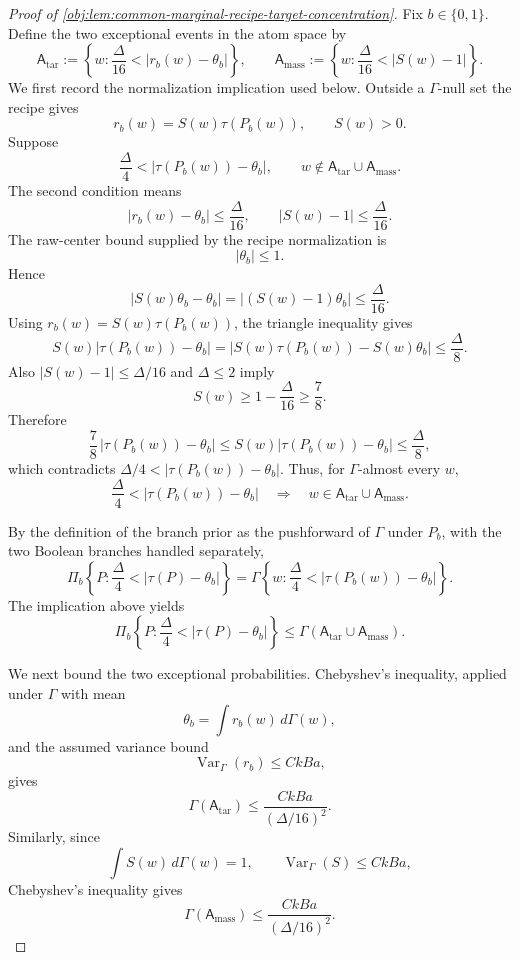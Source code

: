 \begin{proof}[Proof of \cref{obj:lem:common-marginal-recipe-target-concentration}]
Fix \(b\in\{0,1\}\).  Define the two exceptional events in the atom space by
\[
\mathsf A_{\mathrm{tar}}
:=
\left\{w:\frac{\Delta}{16}<|r_b(w)-\theta_b|\right\},
\qquad
\mathsf A_{\mathrm{mass}}
:=
\left\{w:\frac{\Delta}{16}<|S(w)-1|\right\}.
\]
We first record the normalization implication used below.  Outside a \(\Gamma\)-null set the recipe gives
\[
r_b(w)=S(w)\tau(P_b(w)),
\qquad
S(w)>0.
\]
Suppose
\[
\frac{\Delta}{4}<|\tau(P_b(w))-\theta_b|,
\qquad
w\notin \mathsf A_{\mathrm{tar}}\cup\mathsf A_{\mathrm{mass}}.
\]
The second condition means
\[
|r_b(w)-\theta_b|\le \frac{\Delta}{16},
\qquad
|S(w)-1|\le \frac{\Delta}{16}.
\]
The raw-center bound supplied by the recipe normalization is
\[
|\theta_b|\le 1.
\]
Hence
\[
|S(w)\theta_b-\theta_b|
=
|(S(w)-1)\theta_b|
\le \frac{\Delta}{16}.
\]
Using \(r_b(w)=S(w)\tau(P_b(w))\), the triangle inequality gives
\[
S(w)|\tau(P_b(w))-\theta_b|
=
|S(w)\tau(P_b(w))-S(w)\theta_b|
\le
\frac{\Delta}{8}.
\]
Also \(|S(w)-1|\le\Delta/16\) and \(\Delta\le2\) imply
\[
S(w)\ge 1-\frac{\Delta}{16}\ge \frac78 .
\]
Therefore
\[
\frac78\,|\tau(P_b(w))-\theta_b|
\le
S(w)|\tau(P_b(w))-\theta_b|
\le \frac{\Delta}{8},
\]
which contradicts \(\Delta/4<|\tau(P_b(w))-\theta_b|\).  Thus, for \(\Gamma\)-almost every \(w\),
\[
\frac{\Delta}{4}<|\tau(P_b(w))-\theta_b|
\quad\Longrightarrow\quad
w\in\mathsf A_{\mathrm{tar}}\cup\mathsf A_{\mathrm{mass}} .
\]

By the definition of the branch prior as the pushforward of \(\Gamma\) under \(P_b\), with the two Boolean branches handled separately,
\[
\Pi_b\!\left\{P:\frac{\Delta}{4}<|\tau(P)-\theta_b|\right\}
=
\Gamma\!\left\{w:\frac{\Delta}{4}<|\tau(P_b(w))-\theta_b|\right\}.
\]
The implication above yields
\[
\Pi_b\!\left\{P:\frac{\Delta}{4}<|\tau(P)-\theta_b|\right\}
\le
\Gamma(\mathsf A_{\mathrm{tar}}\cup\mathsf A_{\mathrm{mass}}).
\]

We next bound the two exceptional probabilities.  Chebyshev's inequality, applied under \(\Gamma\) with mean
\[
\theta_b=\int r_b(w)\,d\Gamma(w),
\]
and the assumed variance bound
\[
\operatorname{Var}_{\Gamma}(r_b)\le CkBa,
\]
gives
\[
\Gamma(\mathsf A_{\mathrm{tar}})
\le
\frac{CkBa}{(\Delta/16)^2}.
\]
Similarly, since
\[
\int S(w)\,d\Gamma(w)=1,
\qquad
\operatorname{Var}_{\Gamma}(S)\le CkBa,
\]
Chebyshev's inequality gives
\[
\Gamma(\mathsf A_{\mathrm{mass}})
\le
\frac{CkBa}{(\Delta/16)^2}.
\]


\end{proof}
